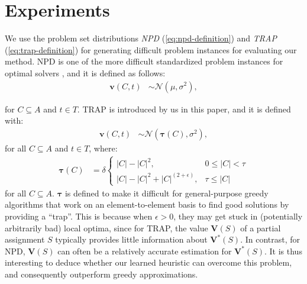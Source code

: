 \documentclass[runningheads]{llncs}
\newcounter{ctTODO}
\newcommand{\TODO}[1]{%
	\textcolor{red}{\textbf{TODO(\arabic{ctTODO}): } #1}%
	\addtocounter{ctTODO}{1}%
}
\begin{document}
	
	\section{Experiments}
	We use the problem set distributions \emph{NPD} (\ref{eq:npd-definition}) and \emph{TRAP} (\ref{eq:trap-definition}) for generating difficult problem instances for evaluating our method. NPD is one of the more difficult standardized problem instances for optimal solvers \cite{prantare2020anytime}, and it is defined as follows:
	\begin{align}
	\bm{v}(C,t) &\sim \mathcal{N}(\mu,\sigma^2),\label{eq:npd-definition}
	\end{align}
	
	\noindent for $C \subseteq A$ and $t\in T$. TRAP is introduced by us in this paper, and it is defined with:
	\begin{align}
	\bm{v}(C, t) &\sim \mathcal{N}(\bm{\tau}(C),\sigma^2),\label{eq:trap-definition}
	\end{align}
	for all $C \subseteq A$ and $t \in T$, where:
	\begin{align*}
	\bm{\tau}(C) &= \delta \begin{cases}
	|C| - |C|^2, &  0\leq |C| < \tau\\
	|C| - |C|^2 + |C|^{(2 + \epsilon)}, &  \tau\leq |C|
	\end{cases}
	\end{align*}
	for all $C \subseteq A$. $\bm{\tau}$ is defined to make it difficult for general-purpose greedy algorithms that work on an element-to-element basis to find good solutions by providing a ``trap''. This is because when $\epsilon > 0$, they may get stuck in (potentially arbitrarily bad) local optima, since for TRAP, the value $\bm{V}(S)$ of a partial assignment $S$ typically provides little information about $\bm{V}^*(S)$. In contrast, for NPD, $\bm{V}(S)$ can often be a relatively accurate estimation for $\bm{V}^*(S)$. It is thus interesting to deduce whether our learned heuristic can overcome this problem, and consequently outperform greedy approximations.
	
\end{document}
